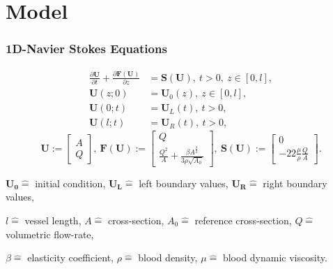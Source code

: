 \documentclass{beamer}
\begin{document}
\section{Model}

\begin{frame}
	\frametitle{1D-Navier Stokes Equations}
	\begin{equation}
		\begin{aligned}
			\frac{\partial \mathbf{U}}{\partial t} + \frac{\partial \mathbf{F} \left(
			\mathbf{U} \right)}{\partial z} &= \mathbf{S} \left( \mathbf{U} \right), \ t>0, \
			z \in \left[ 0,l \right], \\
			\mathbf{U} \left( z;0 \right) &= \mathbf{U}_0 \left( z \right), \ z \in \left[ 0,l \right], \\
			\mathbf{U} \left( 0;t \right) &= \mathbf{U}_L \left( t \right), \ t>0,\\
			\mathbf{U} \left( l;t \right) &= \mathbf{U}_R \left( t \right), \ t>0,
		\end{aligned} \label{eq:1deqs3}
	\end{equation}
	\begin{equation}
		\mathbf{U} :=
		\begin{bmatrix}
			A \\
			Q
		\end{bmatrix}, \ 
		\mathbf{F} \left( \mathbf{U} \right) :=
		\begin{bmatrix}
			Q \\
			\frac{Q^2}{A} + \frac{\beta A^{\frac{3}{2}}}{3\rho\sqrt{A_0}}
		\end{bmatrix}, \ 
		\mathbf{S} \left( \mathbf{U} \right) :=
		\begin{bmatrix}
			0 \\
			-22\frac{\mu}{\rho}\frac{Q}{A}
		\end{bmatrix}.
	\end{equation}

	\vfill

	{\tiny \centering 
		$\mathbf{U_0} \hat{=}$ initial condition, 
		$\mathbf{U_L} \hat{=}$ left boundary values,
		$\mathbf{U_R} \hat{=}$ right boundary values,

		$l \hat{=}$ vessel length,
		$A \hat{=}$ cross-section,
		$A_0 \hat{=}$ reference cross-section,
		$Q \hat{=}$ volumetric flow-rate,

		$\beta \hat{=}$ elasticity coefficient,
		$\rho \hat{=}$ blood density,
		$\mu \hat{=}$ blood dynamic viscosity. 
	\par}


\end{frame}
\end{document}
